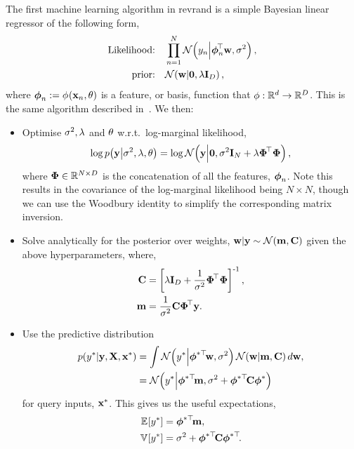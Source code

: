\documentclass[11pt, oneside]{article}
\begin{document}
The first machine learning algorithm in revrand is a simple Bayesian linear
regressor of the following form,
\begin{align}
    \text{Likelihood:} \quad &\prod^N_{n=1} 
    \gausC{\targs_n}{\feats_n\T\weights, \var}, \\
    \text{prior:} \quad &\gausC{\weights}{\mathbf{0}, \reg\ident{D}},
\end{align}
where $\feats_n := \func{\featfunc}{\inss_n, \param}{}$ is a feature, or basis,
function that $\featfunc: \real{d} \to \real{D}$. This is the same algorithm
described in~\cite[Chapter 2]{Rasmussen2006}. We then:
\begin{itemize}
    \item Optimise $\var, \reg$ and $\param$ w.r.t.\ log-marginal likelihood,
        \begin{equation}
            \log \probC{\targ}{\var, \reg, \param} =
            \log \gausC{\targ}{\mathbf{0}, \var\ident{N} + \reg \feat\T\feat},
        \end{equation}
        where $\feat \in \real{N \times D}$ is the concatenation of all the
        features, $\feats_n$. Note this results in the covariance of the
        log-marginal likelihood being $N \times N$, though we can use the
        Woodbury identity to simplify the corresponding matrix inversion.
    \item Solve analytically for the posterior over weights, $\weights | \targ
        \sim \gaus{\pomean, \pocov}$ given the above hyperparameters, where,
        \begin{align*}
            \pocov &= \sbrac{\reg \ident{D} + \frac{1}{\var}
                \feat\T \feat}\inv, \\
            \pomean &= \frac{1}{\var} \pocov \feat\T \targ.
        \end{align*}
    \item Use the predictive distribution
        \begin{align}
            \probC{\targs\test}{\targ, \ins, \inss\test} &= \int
            \gausC{\targs\test}{\feats\testT\weights, \var}
            \gausC{\weights}{\pomean, \pocov} d\weights, \nonumber \\
            &= \gausC{\targs\test}{\feats\testT \pomean,
                \var + \feats\testT \pocov \feats\test}
        \end{align}
        for query inputs, $\inss\test$. This gives us the useful expectations,
        \begin{align}
            \expece{}{\targs\test} &= \feats\testT\pomean, \\
            \evar{}{\targs\test} &= \var + \feats\testT\pocov\feats\testT.
        \end{align}
\end{itemize}
\end{document}

